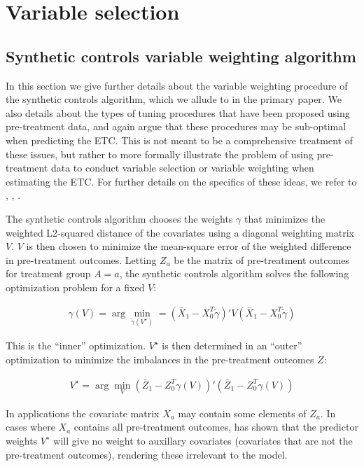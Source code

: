 \section{Variable selection}\label{ssec:varselection}

\subsection{Synthetic controls variable weighting algorithm}

In this section we give further details about the variable weighting procedure of the synthetic controls algorithm, which we allude to in the primary paper. We also details about the types of tuning procedures that have been proposed using pre-treatment data, and again argue that these procedures may be sub-optimal when predicting the ETC. This is not meant to be a comprehensive treatment of these issues, but rather to more formally illustrate the problem of using pre-treatment data to conduct variable selection or variable weighting when estimating the ETC. For further details on the specifics of these ideas, we refer to \cite{abadie2010synthetic}, \cite{abadie2015comparative}, \cite{kaul2015synthetic}.

The synthetic controls algorithm chooses the weights $\gamma$ that minimizes the weighted L2-squared distance of the covariates using a diagonal weighting matrix $V$. $V$ is then chosen to minimize the mean-square error of the weighted difference in pre-treatment outcomes. Letting $Z_a$ be the matrix of pre-treatment outcomes for treatment group $A = a$, the synthetic controls algorithm solves the following optimization problem for a fixed $V$:

\begin{align}
\gamma(V) = \arg\min_{\tilde{\gamma}(V^\star)} = (\bar{X}_1 - X_0^T\tilde{\gamma})'V(\bar{X}_1 - X_0^T\tilde{\gamma}) 
\end{align}

This is the ``inner'' optimization. $V^\star$ is then determined in an ``outer'' optimization to minimize the imbalances in the pre-treatment outcomes $Z$:

\begin{align}
    V^\star = \arg\min_V (\bar{Z}_1 - Z_0^T\gamma(V))'(\bar{Z}_1 - Z_0^T\gamma(V))
\end{align}

In applications the covariate matrix $X_a$ may contain some elements of $Z_a$. In cases where $X_a$ contains all pre-treatment outcomes, \cite{kaul2015synthetic} has shown that the predictor weights $V^\star$ will give no weight to auxillary covariates (covariates that are not the pre-treatment outcomes), rendering these irrelevant to the model. 

